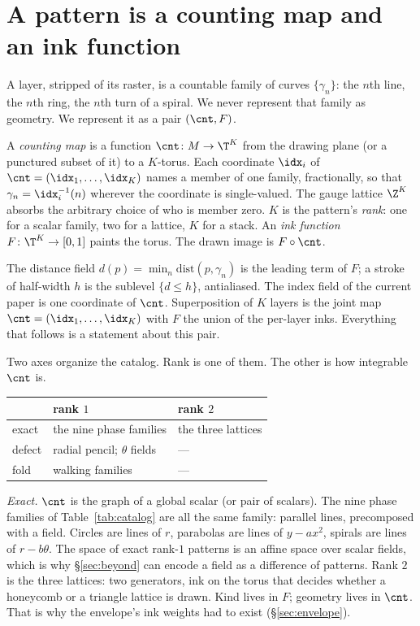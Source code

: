 \section{A pattern is a counting map and an ink function}
\label{sec:object}
\label{sec:field}
\label{sec:catalog}

A layer, stripped of its raster, is a countable family of curves
$\{\gamma_n\}$: the $n$th line, the $n$th ring, the $n$th turn of a spiral.
We never represent that family as geometry. We represent it as a pair
$(\cnt,F)$.

\begin{definition}
A \emph{counting map} is a function $\cnt\colon M\to\T^K$ from the drawing
plane (or a punctured subset of it) to a $K$-torus. Each coordinate
$\idx_i$ of $\cnt=(\idx_1,\dots,\idx_K)$ names a member of one family,
fractionally, so that $\gamma_n=\idx_i^{-1}(n)$ wherever the coordinate
is single-valued. The gauge lattice $\Z^K$ absorbs the arbitrary choice
of who is member zero. $K$ is the pattern's \emph{rank}: one for a
scalar family, two for a lattice, $K$ for a stack.
An \emph{ink function} $F\colon\T^K\to[0,1]$ paints the torus. The
drawn image is $F\circ\cnt$.
\end{definition}

The distance field $d(p)=\min_n\mathrm{dist}(p,\gamma_n)$ is the leading
term of $F$; a stroke of half-width $h$ is the sublevel
$\{d\le h\}$, antialiased. The index field of the current paper is one
coordinate of $\cnt$. Superposition of $K$ layers is the joint map
$\cnt=(\idx_1,\dots,\idx_K)$ with $F$ the union of the per-layer inks.
Everything that follows is a statement about this pair.

Two axes organize the catalog. Rank is one of them. The other is how
integrable $\cnt$ is.

\begin{center}
\small
\begin{tabular}{@{}lll@{}}
  \toprule
  & rank $1$ & rank $2$ \\
  \midrule
  exact
    & the nine phase families
    & the three lattices \\
  defect
    & radial pencil; $\theta$ fields
    & --- \\
  fold
    & walking families
    & --- \\
  \bottomrule
\end{tabular}
\end{center}

\emph{Exact.} $\cnt$ is the graph of a global scalar (or pair of
scalars). The nine phase families of Table~\ref{tab:catalog} are all
the same family: parallel lines, precomposed with a field. Circles are
lines of $r$, parabolas are lines of $y-ax^2$, spirals are lines of
$r-b\theta$. The space of exact rank-$1$ patterns is an affine space
over scalar fields, which is why \S\ref{sec:beyond} can encode a field
as a difference of patterns. Rank $2$ is the three lattices: two
generators, ink on the torus that decides whether a honeycomb or a
triangle lattice is drawn. Kind lives in $F$; geometry lives in
$\cnt$. That is why the envelope's ink weights had to exist
(\S\ref{sec:envelope}).

